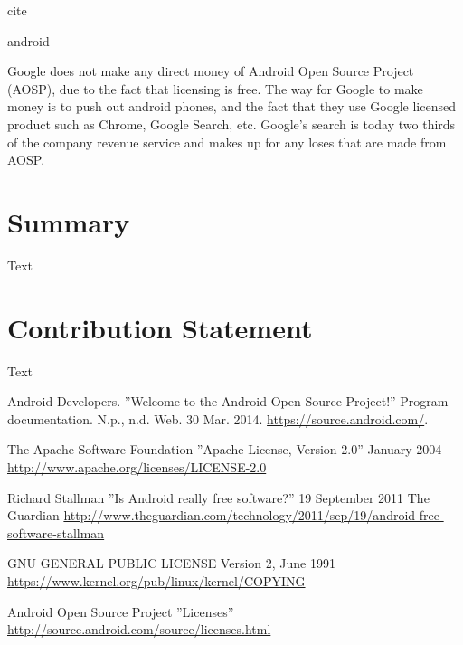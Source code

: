 \documentclass[conference]{IEEEtran}
\begin{document}
{cite{android-

{{Google does not make any direct money of Android Open Source Project (AOSP), due to the fact that licensing is free.\cite{Money} The way for Google to make money is to push out android phones, and the fact that they use Google licensed product such as Chrome, Google Search, etc. Google's search is today two thirds of the company revenue service and makes up for any loses that are made from AOSP.  }}


\section{Summary}

{Text}


\section{Contribution Statement}

{Text}


\begin{thebibliography}{1}



Android Developers. ''Welcome to the Android Open Source Project!'' Program documentation. N.p., n.d. Web. 30 Mar. 2014. \url{https://source.android.com/}.

The Apache Software Foundation ''Apache License, Version 2.0'' January 2004 \url{http://www.apache.org/licenses/LICENSE-2.0}

Richard Stallman ''Is Android really free software?'' 19 September 2011 The Guardian \url{http://www.theguardian.com/technology/2011/sep/19/android-free-software-stallman}

GNU GENERAL PUBLIC LICENSE Version 2, June 1991 \url{https://www.kernel.org/pub/linux/kernel/COPYING}

Android Open Source Project ''Licenses'' \url{http://source.android.com/source/licenses.html}


\end{thebibliography}}}
\end{document}
